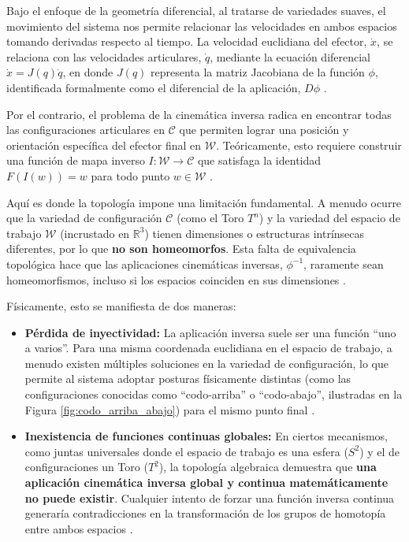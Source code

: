 Bajo el enfoque de la geometría diferencial, al tratarse de variedades suaves, el movimiento del 
sistema nos permite relacionar las velocidades en ambos espacios tomando derivadas respecto 
al tiempo. La velocidad euclidiana del efector, $\dot{x}$, se relaciona con las velocidades 
articulares, $\dot{q}$, mediante la ecuación diferencial $\dot{x} = J(q)\dot{q}$, en donde $J(q)$ 
representa la matriz Jacobiana de la función $\phi$, identificada formalmente como el 
diferencial de la aplicación, $D\phi$ \parencite{choset2005principles}.

Por el contrario, el problema de la cinemática inversa radica en encontrar todas las 
configuraciones articulares en $\mathcal{C}$ que permiten lograr una posición y 
orientación específica del efector final en $\mathcal{W}$. Teóricamente, esto requiere 
construir una función de mapa inverso $I: \mathcal{W} \to \mathcal{C}$ que satisfaga 
la identidad $F(I(w)) = w$ para todo punto $w \in \mathcal{W}$ \parencite{grant2015topology}.

Aquí es donde la topología impone una limitación fundamental. A menudo ocurre que la variedad 
de configuración $\mathcal{C}$ (como el Toro $T^n$) y la variedad del espacio de 
trabajo $\mathcal{W}$ (incrustado en $\mathbb{R}^3$) tienen dimensiones o estructuras 
intrínsecas diferentes, por lo que \textbf{no son homeomorfos}. Esta falta de equivalencia topológica 
hace que las aplicaciones cinemáticas inversas, $\phi^{-1}$, raramente sean homeomorfismos, 
incluso si los espacios coinciden en sus dimensiones \parencite{choset2005principles}. 

Físicamente, esto se manifiesta de dos maneras:
\begin{itemize}
\item \textbf{Pérdida de inyectividad:} La aplicación inversa suele ser una función \enquote{uno a varios}. 
Para una misma coordenada euclidiana en el espacio de trabajo, a menudo existen múltiples 
soluciones en la variedad de configuración, lo que permite al sistema adoptar posturas 
físicamente distintas (como las configuraciones conocidas como \enquote{codo-arriba} o \enquote{codo-abajo}, ilustradas en la Figura \ref{fig:codo_arriba_abajo}) 
para el mismo punto final \parencite{choset2005principles}.
\item \textbf{Inexistencia de funciones continuas globales:} En ciertos mecanismos, como juntas universales 
donde el espacio de trabajo es una esfera ($S^2$) y el de configuraciones un Toro ($T^2$), 
la topología algebraica demuestra que \textbf{una aplicación cinemática inversa global y continua 
matemáticamente no puede existir}. Cualquier intento de forzar una función inversa continua 
generaría contradicciones en la transformación de los grupos de homotopía entre ambos espacios \parencite{grant2015topology}.
\end{itemize}

